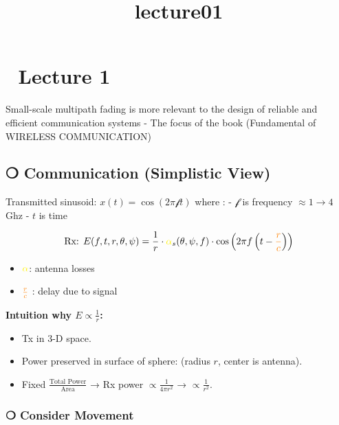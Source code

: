 \documentclass[11pt]{article}
\title{lecture01}
\providecommand{\tightlist}{%
      \setlength{\itemsep}{0pt}\setlength{\parskip}{0pt}}
\begin{document}
    
    \maketitle
    
    

    
    \section{📜 Lecture 1}\label{lecture-1}

Small-scale multipath fading is more relevant to the design of reliable
and efficient communication systems - The focus of the book (Fundamental
of WIRELESS COMMUNICATION)

    \subsection{❍ Communication (Simplistic
View)}\label{communication-simplistic-view}

Transmitted sinusoid: \(x(t) = \cos(2 \pi \mathcal{f} t)\) where : -
\(\mathcal{f}\) is frequency \(\approx 1 \to 4\) Ghz - \(t\) is time

    \begin{equation}
\text{Rx: } E(f, t, r, \theta, \psi) = \frac{1}{r} \cdot {\color{yellow}\alpha}_s(\theta, \psi, f) \cdot \cos\left( 2 \pi f \left( t - {\color{orange}\frac{r}{c}} \right) \right)
\end{equation}

\begin{itemize}
\tightlist
\item
  \({\color{yellow}\alpha}\): antenna losses
\item
  \({\color{orange}\frac{r}{c}}\) : delay due to signal
\end{itemize}

\textbf{Intuition why \(E \propto \frac{1}{r}\):}

\begin{itemize}
\tightlist
\item
  Tx in 3-D space.
\item
  Power preserved in surface of sphere: (radius \(r\), center is
  antenna).
\item
  Fixed \(\frac{\text{Total Power}}{\text{ Area }}\) → Rx power
  \(\propto \frac{1}{4 \pi r^2}\) → \(\propto \frac{1}{r^2}\).
\end{itemize}

    \subsubsection{❍ Consider Movement}\label{consider-movement}
\end{document}
